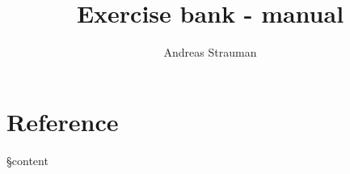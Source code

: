 \documentclass{article}
\title{Exercise bank - manual}
\author{Andreas Strauman}
\begin{document}
\maketitle
\tableofcontents
\clearpage

\section{Reference}
§content
\end{document}
